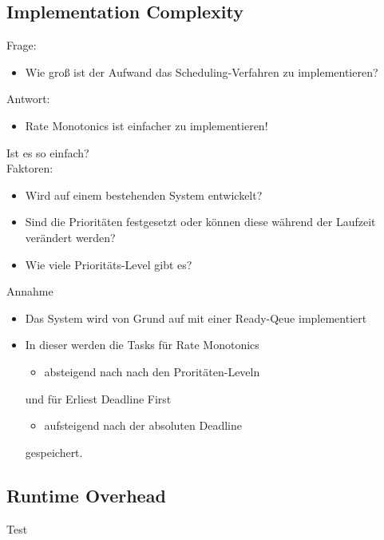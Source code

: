 \subsection{Implementation Complexity}
\begin{frame}{\subsecname}
	Frage:
	\begin{itemize}
		\item Wie groß ist der Aufwand das Scheduling-Verfahren zu implementieren?
	\end{itemize}
	Antwort:
	\begin{itemize}
		\item Rate Monotonics ist einfacher zu implementieren!
	\end{itemize}
\end{frame}

\begin{frame}{\subsecname}
	Ist es so einfach?\\\pause
	Faktoren:
	\begin{itemize}
		\item Wird auf einem bestehenden System entwickelt?
		\item Sind die Prioritäten festgesetzt oder können diese während der Laufzeit verändert werden?
		\item Wie viele Prioritäts-Level gibt es? %
	\end{itemize}
\end{frame}

\begin{frame}{\subsecname}
	Annahme
	\begin{itemize}
		\item Das System wird von Grund auf mit einer Ready-Qeue implementiert\pause
		\item In dieser werden die Tasks für Rate Monotonics
			\begin{itemize}
				\item absteigend nach nach den Proritäten-Leveln
			\end{itemize}
			und für Erliest Deadline First
			\begin{itemize}
				\item aufsteigend nach der absoluten Deadline
			\end{itemize} gespeichert.
	\end{itemize}
\end{frame}

\subsection{Runtime Overhead}
\begin{frame}{\subsecname}
	Test
\end{frame}

